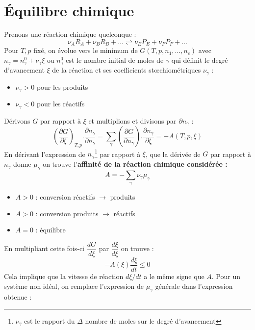 \documentclass[11pt, a4paper, openany]{book}
\begin{document}
		\section{Équilibre chimique}
		Prenons une réaction chimique quelconque : 
		\begin{equation}
			\nu_A R_A + \nu_B R_B + \dots \rightleftharpoons \nu_E P_E + \nu_F P_F + \dots
		\end{equation}
		Pour $T, p$ fixé, on évolue vers le minimum de $G(T,p,n_1, ..., n_c)$ avec $n_\gamma = n_\gamma^0 + \nu_\gamma\xi$ ou $n_\gamma^0$ est le nombre initial de moles de $\gamma$ qui définit le degré d'avancement $\xi$ de la réaction et ses coefficients stœchiométriques $\nu_\gamma$ :
		\begin{itemize}
			\item $\nu_\gamma > 0$ pour les produits
			\item $\nu_\gamma < 0$ pour les réactifs
		\end{itemize}
		Dérivons $G$ par rapport à $\xi$ et multiplions et divisons par $\partial n_\gamma$ :
		\begin{equation}
			\left(\frac{\partial G}{\partial\xi}\right)_{T,p} . \frac{\partial n_\gamma}{\partial n_\gamma} = \sum_\gamma \left(\frac{\partial G}{\partial n_\gamma}\right).\frac{\partial n_\gamma}{\partial\xi} = -A(T,p,\xi)
		\end{equation}
		En dérivant l'expression de $n_\gamma$\footnote{$\nu_\gamma$ est le rapport du $\Delta$ nombre de moles sur le degré d'avancement} par rapport à $\xi$, que la dérivée de $G$ par rapport à $n_\gamma$ donne $\mu_\gamma$ on trouve l'\textbf{affinité de la réaction chimique considérée :}
		\begin{equation}
			A = - \sum_\gamma \nu_\gamma \mu_\gamma
		\end{equation}
		\begin{itemize}
			\item $A > 0$ : conversion réactifs $\rightarrow$ produits
			\item $A > 0$ : conversion produits $\rightarrow$ réactifs
			\item $A = 0$ : équilibre
		\end{itemize}
		En multipliant cette fois-ci $\dfrac{dG}{d\xi}$ par $\dfrac{d\xi}{d\xi}$ on trouve :
		\begin{equation}
			-A(\xi)\frac{d\xi}{dt} \leq 0
		\end{equation}
		Cela implique que la vitesse de réaction $d\xi/dt$ a le même signe que $A$. Pour un système non idéal, on remplace l'expression de $\mu_\gamma$ générale dans l'expression obtenue :
\end{document}
